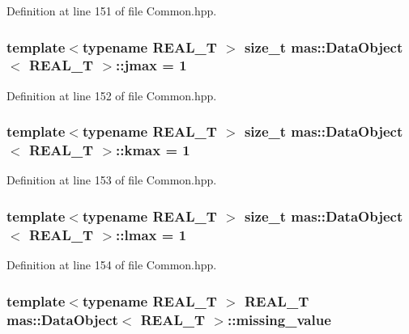 Definition at line 151 of file Common.\-hpp.

\hypertarget{structmas_1_1_data_object_aef9f72f453df6f2796e415306cee441e}{
\subsubsection[{jmax}]{\setlength{\rightskip}{0pt plus 5cm}template$<$typename R\-E\-A\-L\-\_\-\-T $>$ size\-\_\-t {\bf mas\-::\-Data\-Object}$<$ R\-E\-A\-L\-\_\-\-T $>$\-::jmax = 1}}\label{structmas_1_1_data_object_aef9f72f453df6f2796e415306cee441e}


Definition at line 152 of file Common.\-hpp.

\hypertarget{structmas_1_1_data_object_a01bdbd0efce9891dac23e3beb746e2a9}{
\subsubsection[{kmax}]{\setlength{\rightskip}{0pt plus 5cm}template$<$typename R\-E\-A\-L\-\_\-\-T $>$ size\-\_\-t {\bf mas\-::\-Data\-Object}$<$ R\-E\-A\-L\-\_\-\-T $>$\-::kmax = 1}}\label{structmas_1_1_data_object_a01bdbd0efce9891dac23e3beb746e2a9}


Definition at line 153 of file Common.\-hpp.

\hypertarget{structmas_1_1_data_object_a5b9a9d140f5378c98c10c1abd0c89bbc}{
\subsubsection[{lmax}]{\setlength{\rightskip}{0pt plus 5cm}template$<$typename R\-E\-A\-L\-\_\-\-T $>$ size\-\_\-t {\bf mas\-::\-Data\-Object}$<$ R\-E\-A\-L\-\_\-\-T $>$\-::lmax = 1}}\label{structmas_1_1_data_object_a5b9a9d140f5378c98c10c1abd0c89bbc}


Definition at line 154 of file Common.\-hpp.

\hypertarget{structmas_1_1_data_object_a02a3810366fbf0a3732e8dd84d80f39e}{
\subsubsection[{missing\-\_\-value}]{\setlength{\rightskip}{0pt plus 5cm}template$<$typename R\-E\-A\-L\-\_\-\-T $>$ R\-E\-A\-L\-\_\-\-T {\bf mas\-::\-Data\-Object}$<$ R\-E\-A\-L\-\_\-\-T $>$\-::missing\-\_\-value}}\label{structmas_1_1_data_object_a02a3810366fbf0a3732e8dd84d80f39e}


